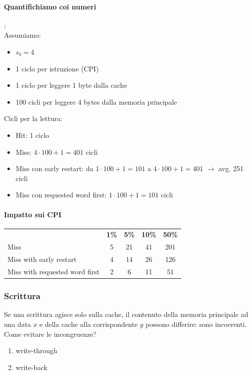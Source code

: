 \documentclass[12pt,a4paper]{article}
\begin{document}
\paragraph{Quantifichiamo coi numeri}:\\
Assumiamo:
\begin{itemize}
\item $s_b =4$
\item 1 ciclo per istruzione (CPI)
\item 1 ciclo per leggere 1 byte dalla cache
\item 100 cicli per leggere 4 bytes dalla memoria principale
\end{itemize}
Cicli per la lettura:
\begin{itemize}
\item Hit: 1 ciclo
\item Miss: $4 \cdot 100 +1=401$ cicli
\item Miss con early restart: da $1 \cdot 100 +1=101$ a $4 \cdot 100 +1=401$ $\rightarrow$ avg. 251 cicli
\item Miss con requested word first: $1 \cdot 100 +1=101$ cicli
\end{itemize}

\paragraph{Impatto sui CPI}
\begin{center}
\begin{tabular}{lcccc}
 & \textbf{1\%} & \textbf{5\%} & \textbf{10\%} & \textbf{50\%} \\
Miss & 5 & 21 & 41 & 201 \\
Miss with early restart & 4 & 14 & 26 & 126 \\
Miss with requested word first & 2 & 6 & 11 & 51
\end{tabular}
\end{center}

\subsubsection{Scrittura}
Se una scrittura agisce solo sulla cache, il contenuto della memoria principale ad una data $x$ e della cache alla corrispondente $y$ possono differire: sono incoerenti.\\
Come evitare le incongruenze?
\begin{enumerate}
\item write-through
\item write-back
\end{enumerate}
\end{document}
